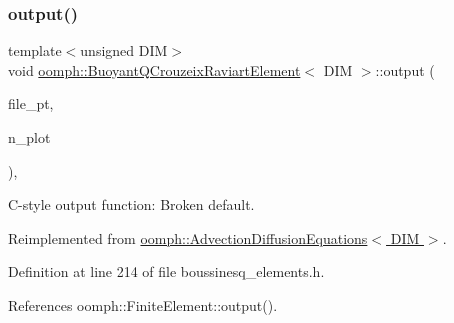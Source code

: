 \mbox{\label{classoomph_1_1BuoyantQCrouzeixRaviartElement_a48039bbb2f32897b70fb0858ff739516}} 
\subsubsection{\texorpdfstring{output()}{output()}\hspace{0.1cm}{\footnotesize\ttfamily [4/4]}}
{\footnotesize\ttfamily template$<$unsigned D\+IM$>$ \\
void \hyperlink{classoomph_1_1BuoyantQCrouzeixRaviartElement}{oomph\+::\+Buoyant\+Q\+Crouzeix\+Raviart\+Element}$<$ D\+IM $>$\+::output (\begin{DoxyParamCaption}\item[{F\+I\+LE $\ast$}]{file\+\_\+pt,  }\item[{const unsigned \&}]{n\+\_\+plot }\end{DoxyParamCaption})\hspace{0.3cm}{\ttfamily [inline]}, {\ttfamily [virtual]}}



C-\/style output function\+: Broken default. 



Reimplemented from \hyperlink{classoomph_1_1AdvectionDiffusionEquations_a03a096ff864ee53c8823b08e0d2f6091}{oomph\+::\+Advection\+Diffusion\+Equations$<$ D\+I\+M $>$}.



Definition at line 214 of file boussinesq\+\_\+elements.\+h.



References oomph\+::\+Finite\+Element\+::output().

\mbox{\label{classoomph_1_1BuoyantQCrouzeixRaviartElement_ad36c2a18f2de8b00f76baccc15b768c2}} 
